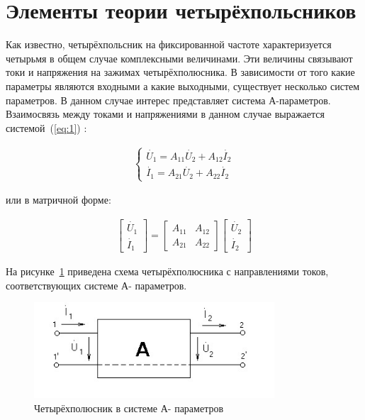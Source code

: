 \section{Элементы теории четырёхпольсников}

Как  известно,  четырёхпольсник  на  фиксированной  частоте характеризуется четырьмя в общем случае комплексными величинами. Эти величины  связывают  токи  и  напряжения на зажимах четырёхполюсника. В зависимости  от  того  какие  параметры  являются  входными  а  какие выходными,  существует  несколько  систем  параметров.  В  данном  случае интерес  представляет  система  А-параметров.  Взаимосвязь  между  токами  и напряжениями в данном случае выражается системой~(\ref{eq:1}) : 


\begin{equation}
\label{eq:1}
\begin{aligned}
 \begin{cases}
\dot{U_{1}} = A_{11}\dot{U_{2}} + A_{12}\dot{I_{2}}\\
\dot{I_{1}} = A_{21}\dot{U_{2}} + A_{22}\dot{I_{2}}
 \end{cases}
\end{aligned}
\end{equation}


или в матричной форме: 


\begin{equation}
\label{eq:1a}
\begin{aligned}
\begin{bmatrix} \dot{U_{1}} \\ \dot{I_{1}} \end{bmatrix} = \begin{bmatrix} A_{11} & A_{12}\\ A_{21} & A_{22} \end{bmatrix} \begin{bmatrix} \dot{U_{2}} \\ \dot{I_{2}} \end{bmatrix}
\end{aligned}
\end{equation}



На  рисунке~\ref{p:RIs001}  приведена  схема  четырёхполюсника  с  направлениями токов, соответствующих системе А- параметров. 



\begin{figure}[H] \centering
  \includegraphics[width=0.8\textwidth]{./content/RIs001.jpg}
  \caption{Четырёхполюсник в системе А- параметров} \label{p:RIs001}
\end{figure}



